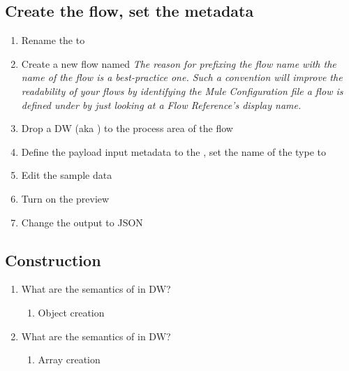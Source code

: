 \subsection{Create the flow, set the metadata}
\begin{enumerate}
\item Rename the  to 
\item Create a new flow named 
  \newline
  \emph{
    The reason for prefixing the flow name with the name of the flow is a best-practice one.
    Such a convention will improve the readability of your flows by identifying the
    Mule Configuration file a flow is defined under by just looking at a Flow Reference's
    display name.
  }
\item Drop a DW (aka ) to the process area of the flow
\item Define the payload input metadata to the ,
  set the name of the type to 
\item Edit the sample data
\item Turn on the preview
\item Change the output to JSON
\end{enumerate}

\subsection{Construction}
\begin{enumerate}[resume*]
\item What are the semantics of \ttt{\{\}} in DW?
  \begin{enumerate}
  \item Object creation
  \end{enumerate}
\item What are the semantics of \ttt{[]} in DW?
  \begin{enumerate}
  \item Array creation
  \end{enumerate}
\end{enumerate}

